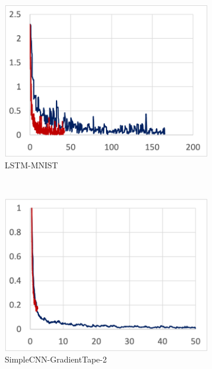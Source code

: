 \begin{figure}[!ht]
  \centering
  \begin{subfigure}[t]{.24\textwidth}
    \includegraphics[width=\textwidth]{tape-lstm}
    \caption{LSTM-MNIST}
  \end{subfigure}
  ~ 
  \begin{subfigure}[t]{.24\textwidth}
    \includegraphics[width=\textwidth]{tape-simple2}
    \caption{SimpleCNN-GradientTape-2}
  \end{subfigure}
  ~
  \begin{subfigure}[t]{.24\textwidth}

\end{subfigure}
\end{figure}
